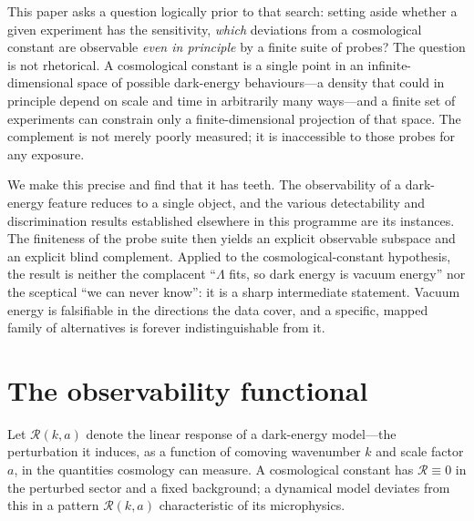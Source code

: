 \documentclass[twocolumn,10pt]{article}
\begin{document}
This paper asks a question logically prior to that search: setting aside whether
a given experiment has the sensitivity, \emph{which} deviations from a
cosmological constant are observable \emph{even in principle} by a finite suite
of probes? The question is not rhetorical. A cosmological constant is a single
point in an infinite-dimensional space of possible dark-energy behaviours---a
density that could in principle depend on scale and time in arbitrarily many
ways---and a finite set of experiments can constrain only a finite-dimensional
projection of that space. The complement is not merely poorly measured; it is
inaccessible to those probes for any exposure.

We make this precise and find that it has teeth. The observability of a
dark-energy feature reduces to a single object, and the various detectability
and discrimination results established elsewhere in this programme are its
instances. The finiteness of the probe suite then yields an explicit
observable subspace and an explicit blind complement. Applied to the
cosmological-constant hypothesis, the result is neither the complacent ``$\Lambda$
fits, so dark energy is vacuum energy'' nor the sceptical ``we can never know'':
it is a sharp intermediate statement. Vacuum energy is falsifiable in the
directions the data cover, and a specific, mapped family of alternatives is
forever indistinguishable from it.

\section{The observability functional}
\label{sec:functional}

Let $\mathcal{R}(k,a)$ denote the linear response of a dark-energy model---the
perturbation it induces, as a function of comoving wavenumber $k$ and scale
factor $a$, in the quantities cosmology can measure. A cosmological constant has
$\mathcal{R}\equiv0$ in the perturbed sector and a fixed background; a dynamical
model deviates from this in a pattern $\mathcal{R}(k,a)$ characteristic of its
microphysics.
\end{document}
